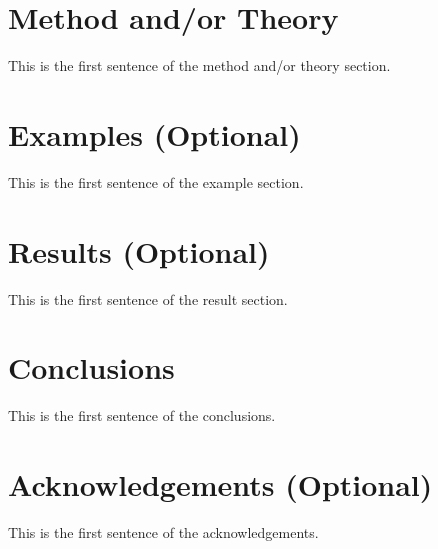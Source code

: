 \documentclass{madrid15WS}
\begin{document}
\section{Method and/or Theory}

This is the first sentence of the method and/or theory section.

\section{Examples (Optional)}

This is the first sentence of the example section.

\section{Results (Optional)}

This is the first sentence of the result section.


\section{Conclusions}

This is the first sentence of the conclusions.

\section{Acknowledgements (Optional)}

This is the first sentence of the acknowledgements.

%
%
% 
\end{document}

